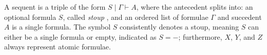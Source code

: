\documentclass[submission,copyright,creativecommons]{eptcs}
\theoremstyle{definition}
\newcommand{\vdG}{\vdash}
\begin{document}
A sequent is a triple of the form $S \mid \Gamma \vdG A$, where the antecedent splits into: an optional formula $S$, called \emph{stoup} \cite{girard:constructive:91}, and an ordered list of formulae $\Gamma$ and succedent $A$ is a single formula.
The symbol $S$ consistently denotes a stoup, meaning $S$ can either be a single formula or empty, indicated as $S = {-}$; furthermore, $X$, $Y$, and $Z$ always represent atomic formulae.
\end{document}
